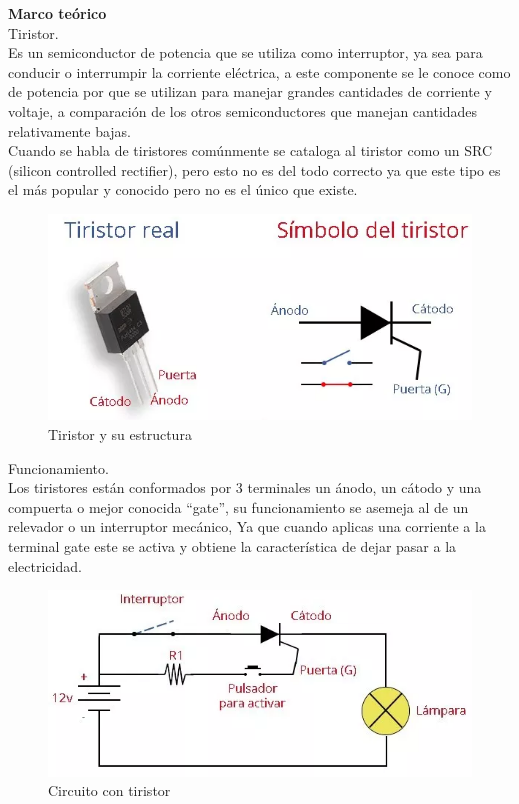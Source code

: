 \documentclass[10pt,a4paper]{article}
\begin{document}
\textbf{Marco teórico}\\
Tiristor.\\
Es un semiconductor de potencia que se utiliza como interruptor, ya sea para conducir o interrumpir la corriente eléctrica, a este componente se le conoce como de potencia por que se utilizan para manejar grandes cantidades de corriente y voltaje, a comparación de los otros semiconductores que manejan cantidades relativamente bajas.\\
Cuando se habla de tiristores comúnmente se cataloga al tiristor como un SRC (silicon controlled rectifier), pero esto no es del todo correcto ya que este tipo es el más popular y conocido pero no es el único que existe.
\begin{figure}[hbtp]
\centering
\includegraphics[scale=0.5]{Pictures/Tiristor.PNG}
\caption{Tiristor y su estructura}
\end{figure}

Funcionamiento.\\
Los tiristores están conformados por 3 terminales un ánodo, un cátodo y una compuerta o mejor conocida “gate”, su funcionamiento se asemeja al de un relevador o un interruptor mecánico, Ya que cuando aplicas una corriente a la terminal gate este se activa y obtiene la característica de dejar pasar a la electricidad.
\begin{figure}[hbtp]
\centering
\includegraphics[scale=0.6]{Pictures/Circuito.PNG}
\caption{Circuito con tiristor}
\end{figure}
\end{document}
